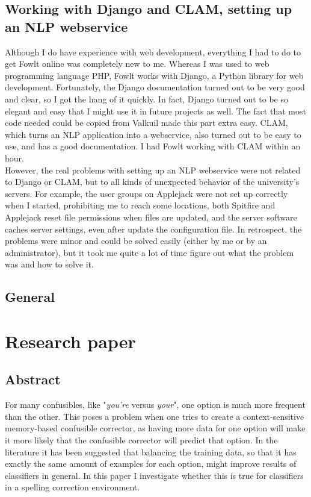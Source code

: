 \documentclass[12pt]{article}
\let\stdsection\section
\renewcommand\section{\newpage\stdsection}
\begin{document}
\subsection{Working with Django and CLAM, setting up an NLP webservice}
Although I do have experience with web development, everything I had to do to get Fowlt online was completely new to me. Whereas I was used to web programming language PHP, Fowlt works with Django, a Python library for web development. Fortunately, the Django documentation turned out to be very good and clear, so I got the hang of it quickly. In fact, Django turned out to be so elegant and easy that I might use it in future projects as well. The fact that most code needed could be copied from Valkuil made this part extra easy. CLAM, which turns an NLP application into a webservice, also turned out to be easy to use, and has a good documentation. I had Fowlt working with CLAM within an hour.
\\\indent
However, the real problems with setting up an NLP webservice were not related to Django or CLAM, but to all kinds of unexpected behavior of the university's servers. For example, the user groups on Applejack were not set up correctly when I started, prohibiting me to reach some locations, both Spitfire and Applejack reset file permissions when files are updated, and the server software caches server settings, even after update the configuration file. In retrospect, the problems were minor and could be solved easily (either by me or by an administrator), but it took me quite a lot of time figure out what the problem was and how to solve it.

\subsection{General}


\section{Research paper}

\subsection*{Abstract}

For many confusibles, like "\emph{you're} versus \emph{your}", one option is much more frequent than the other. This poses a problem when one tries to create a context-sensitive memory-based confusible corrector, as having more data for one option will make it more likely that the confusible corrector will predict that option. In the literature it has been suggested that balancing the training data, so that it has exactly the same amount of examples for each option, might improve results of classifiers in general. In this paper I investigate whether this is true for classifiers in a spelling correction environment.
\end{document}
